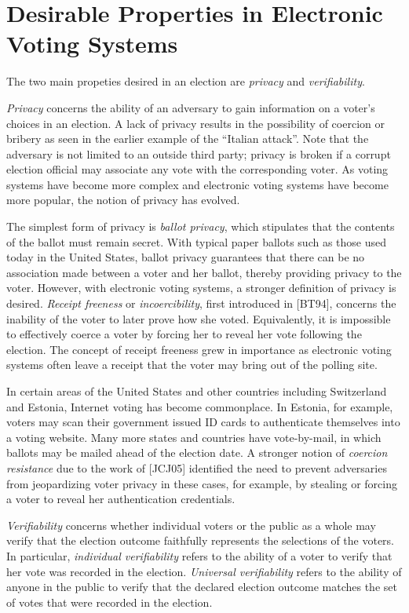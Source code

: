 \section{Desirable Properties in Electronic Voting Systems}

The two main propeties desired in an election are \emph{privacy} and \emph{verifiability}.

\emph{Privacy} concerns the ability of an adversary to gain information on a voter's choices in an election. A lack of privacy results in the possibility of coercion or bribery as seen in the earlier example of the ``Italian attack''. Note that the adversary is not limited to an outside third party; privacy is broken if a corrupt election official may associate any vote with the corresponding voter. As voting systems have become more complex and electronic voting systems have become more popular, the notion of privacy has evolved.

The simplest form of privacy is \emph{ballot privacy}, which stipulates that the contents of the ballot must remain secret. With typical paper ballots such as those used today in the United States, ballot privacy guarantees that there can be no association made between a voter and her ballot, thereby providing privacy to the voter. However, with electronic voting systems, a stronger definition of privacy is desired. \emph{Receipt freeness} or \emph{incoercibility}, first introduced in [BT94], concerns the inability of the voter to later prove how she voted. Equivalently, it is impossible to effectively coerce a voter by forcing her to reveal her vote following the election. The concept of receipt freeness grew in importance as electronic voting systems often leave a receipt that the voter may bring out of the polling site.

In certain areas of the United States and other countries including Switzerland and Estonia, Internet voting has become commonplace. In Estonia, for example, voters may scan their government issued ID cards to authenticate themselves into a voting website. Many more states and countries have vote-by-mail, in which ballots may be mailed ahead of the election date. A stronger notion of \emph{coercion resistance} due to the work of [JCJ05] identified the need to prevent adversaries from jeopardizing voter privacy in these cases, for example, by stealing or forcing a voter to reveal her authentication credentials.

\emph{Verifiability} concerns whether individual voters or the public as a whole may verify that the election outcome faithfully represents the selections of the voters. In particular, \emph{individual verifiability} refers to the ability of a voter to verify that her vote was recorded in the election. \emph{Universal verifiability} refers to the ability of anyone in the public to verify that the declared election outcome matches the set of votes that were recorded in the election.

